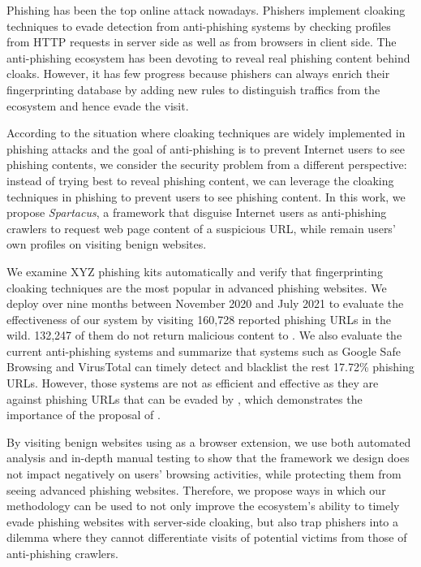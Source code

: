 Phishing has been the top online attack nowadays.
Phishers implement cloaking techniques to evade detection from anti-phishing systems by checking profiles from HTTP requests in server side as well as from browsers in client side.
The anti-phishing ecosystem has been devoting to reveal real phishing content behind cloaks.
However, it has few progress because phishers can always enrich their fingerprinting database by adding new rules to distinguish traffics from the ecosystem and hence evade the visit.

According to the situation where cloaking techniques are widely implemented in phishing attacks and the goal of anti-phishing is to prevent Internet users to see phishing contents, we consider the security problem from a different perspective: instead of trying best to reveal phishing content, we can leverage the cloaking techniques in phishing to prevent users to see phishing content. In this work, we propose \emph{Spartacus}, a framework that disguise Internet users as anti-phishing crawlers to request web page content of a suspicious URL, while remain users' own profiles on visiting benign websites.


We examine XYZ phishing kits automatically and verify that fingerprinting cloaking techniques are the most popular in advanced phishing websites.
We deploy \spartacus over nine months between November 2020 and July 2021 to evaluate the effectiveness of our system by visiting 160,728 reported phishing URLs in the wild.
132,247 of them do not return malicious content to \spartacus.
We also evaluate the current anti-phishing systems and summarize that systems such as Google Safe Browsing and VirusTotal can timely detect and blacklist the rest 17.72\% phishing URLs.
However, those systems are not as efficient and effective as they are against phishing URLs that can be evaded by \spartacus,
which demonstrates the importance of the proposal of \spartacus.

By visiting benign websites using \spartacus as a browser extension, we use both automated analysis and in-depth manual testing to show that the framework we design does not impact negatively on users' browsing activities, while protecting them from seeing advanced phishing websites.
Therefore, we propose ways in which our methodology can be used to not only improve the ecosystem’s ability to timely evade phishing websites with server-side cloaking, but also trap phishers into a dilemma where they cannot differentiate visits of potential victims from those of anti-phishing crawlers.
